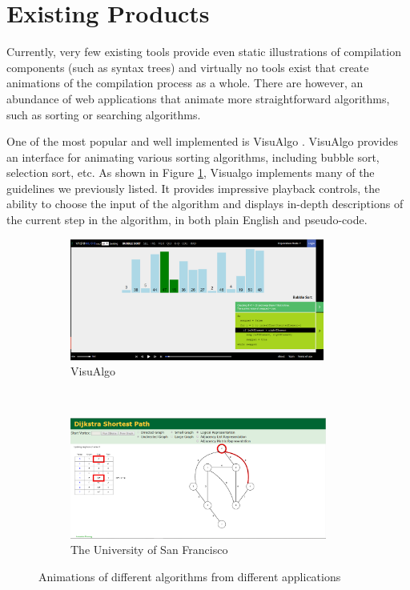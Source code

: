 \documentclass{l4proj}
\begin{document}
\section{Existing Products}
Currently, very few existing tools provide even static illustrations of compilation components (such as syntax trees) and virtually no tools exist that create animations of the compilation process as a whole. There are however, an abundance of web applications that animate more straightforward algorithms, such as sorting or searching algorithms. 

One of the most popular and well implemented is VisuAlgo \cite{visualgo}. VisuAlgo provides an interface for animating various sorting algorithms, including bubble sort, selection sort, etc. As shown in Figure \ref{fig:visualgo}, Visualgo implements many of the guidelines we previously listed. It provides impressive playback controls, the ability to choose the input of the algorithm and displays in-depth descriptions of the current step in the algorithm, in both plain English and pseudo-code. 

\begin{figure}
	\centering
	\begin{subfigure}[b]{0.45\textwidth}
		\includegraphics[height=4cm,width=\linewidth]{images/visualgo.png}
		\caption{VisuAlgo}
		\label{fig:visualgo}
	\end{subfigure}
	~
	\begin{subfigure}[b]{0.45\textwidth}
		\includegraphics[height=4cm,width=\linewidth]{images/dijkstra.png}
		\caption{The University of San Francisco}
		\label{fig:dijkstra}
	\end{subfigure}
	\caption{Animations of different algorithms from different applications}\label{fig:visualgo-dijkstra}	
\end{figure}
\end{document}
